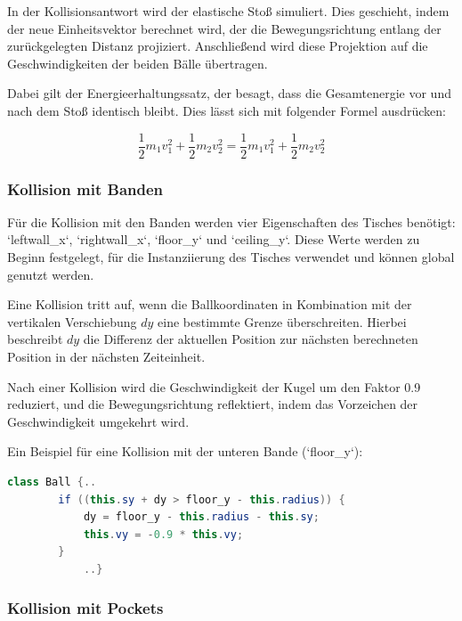 \documentclass[a4paper,12pt]{article}
\begin{document}
In der Kollisionsantwort wird der elastische Stoß simuliert. Dies geschieht, indem der neue Einheitsvektor berechnet wird, der die Bewegungsrichtung entlang der zurückgelegten Distanz projiziert. Anschließend wird diese Projektion auf die Geschwindigkeiten der beiden Bälle übertragen.  

Dabei gilt der Energieerhaltungssatz, der besagt, dass die Gesamtenergie vor und nach dem Stoß identisch bleibt. \cite{LEIFIphysik} Dies lässt sich mit folgender Formel ausdrücken:  

\begin{equation}
	\frac{1}{2} m_1 v_1^2 + \frac{1}{2} m_2 v_2^2 = \frac{1}{2} m_1 v_1^2 + \frac{1}{2} m_2 v_2^2
\end{equation}	
	
	\subsubsection{Kollision mit Banden}  
	
	Für die Kollision mit den Banden werden vier Eigenschaften des Tisches benötigt:  
	`leftwall\_x`, `rightwall\_x`, `floor\_y` und `ceiling\_y`.  
	Diese Werte werden zu Beginn festgelegt, für die Instanziierung des Tisches verwendet und können global genutzt werden.  
	
	Eine Kollision tritt auf, wenn die Ballkoordinaten in Kombination mit der vertikalen Verschiebung $\mathit{dy}$ eine bestimmte Grenze überschreiten.  
	Hierbei beschreibt $\mathit{dy}$ die Differenz der aktuellen Position zur nächsten berechneten Position in der nächsten Zeiteinheit.  
	
	Nach einer Kollision wird die Geschwindigkeit der Kugel um den Faktor 0.9 reduziert,  
	und die Bewegungsrichtung reflektiert, indem das Vorzeichen der Geschwindigkeit umgekehrt wird.  
	
	Ein Beispiel für eine Kollision mit der unteren Bande (`floor\_y`):  
	\begin{lstlisting}[language=Java, columns=fixed, tabsize=2, xleftmargin=10pt, frame=single]  
			class Ball {..
		if ((this.sy + dy > floor_y - this.radius)) {  
			dy = floor_y - this.radius - this.sy;  
			this.vy = -0.9 * this.vy;  
		} 
			..} 
	\end{lstlisting}  
	
	
	
	
\subsubsection{Kollision mit Pockets}
\end{document}
